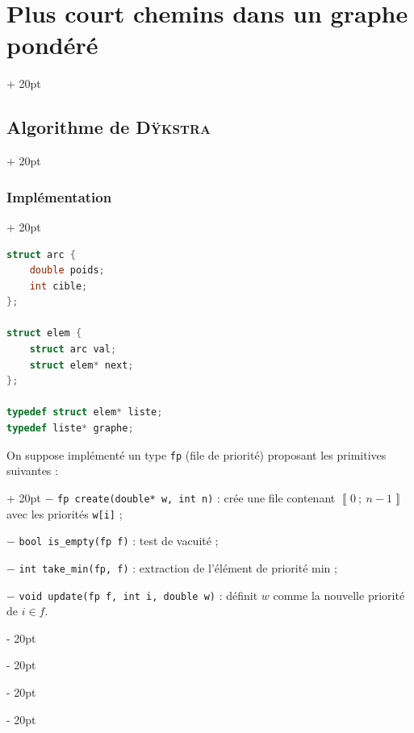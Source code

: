 \documentclass[a4paper, 12pt, twoside]{article}
\newcommand{\nset}[2]{\left\llbracket #1\ ;\ #2 \right\rrbracket}
\newcommand{\ind}[1][20pt]{\advance\leftskip + #1}
\newcommand{\deind}[1][20pt]{\advance\leftskip - #1}
\newenvironment{indt}[2][20pt]{#2 \par \ind[#1]}{\par \deind} %
\begin{document}
\begin{indt}{\section{Plus court chemins dans un graphe pondéré}}
\begin{indt}{\subsection{Algorithme de \textsc{Dÿkstra}}}
\begin{indt}{\subsubsection{Implémentation}}
                \begin{lstlisting}[language=C, xleftmargin=80pt]
struct arc {
    double poids;
    int cible;
};

struct elem {
    struct arc val;
    struct elem* next;
};

typedef struct elem* liste;
typedef liste* graphe;\end{lstlisting}

                \begin{indt}{On suppose implémenté un type \texttt{fp} (file de priorité) proposant les primitives suivantes :}
                    $-$ \texttt{fp create(double* w, int n)} : crée une file contenant $\nset 0 {n - 1}$ avec les priorités \texttt{w[i]} ;

                    $-$ \texttt{bool is\_empty(fp f)} : test de vacuité ;

                    $-$ \texttt{int take\_min(fp, f)} : extraction de l'élément de priorité min ;

                    $-$ \texttt{void update(fp f, int i, double w)} : définit $w$ comme la nouvelle priorité de $i \in f$.
                \end{indt}
            \end{indt}
        \end{indt}
    \end{indt}
    
    
    
\end{document}
